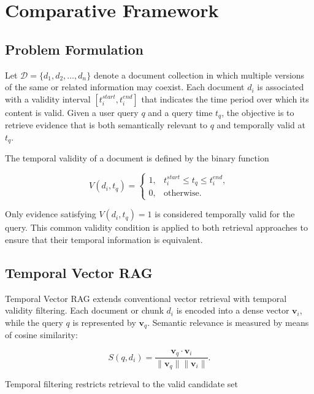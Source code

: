 \documentclass[conference]{IEEEtran}
\numberwithin{equation}{section}
\begin{document}
\section{Comparative Framework}

\subsection{Problem Formulation}

Let $\mathcal{D}=\{d_1,d_2,\ldots,d_n\}$ denote a document collection in which multiple versions of the same or related information may coexist. Each document $d_i$ is associated with a validity interval $[t_i^{start}, t_i^{end}]$ that indicates the time period over which its content is valid. Given a user query $q$ and a query time $t_q$, the objective is to retrieve evidence that is both semantically relevant to $q$ and temporally valid at $t_q$.

The temporal validity of a document is defined by the binary function

\begin{equation}
V(d_i,t_q)=
\begin{cases}
1, & t_i^{start} \leq t_q \leq t_i^{end},\\
0, & \text{otherwise}.
\end{cases}
\label{eq:temporal_validity}
\end{equation}

Only evidence satisfying $V(d_i,t_q)=1$ is considered temporally valid for the query. This common validity condition is applied to both retrieval approaches to ensure that their temporal information is equivalent.

\subsection{Temporal Vector RAG}

Temporal Vector RAG extends conventional vector retrieval with temporal validity filtering. Each document or chunk $d_i$ is encoded into a dense vector $\mathbf{v}_i$, while the query $q$ is represented by $\mathbf{v}_q$. Semantic relevance is measured by means of cosine similarity:

\begin{equation}
S(q,d_i)=\frac{\mathbf{v}_q \cdot \mathbf{v}_i}{\|\mathbf{v}_q\|\|\mathbf{v}_i\|}.
\label{eq:similarity}
\end{equation}

Temporal filtering restricts retrieval to the valid candidate set
\end{document}
